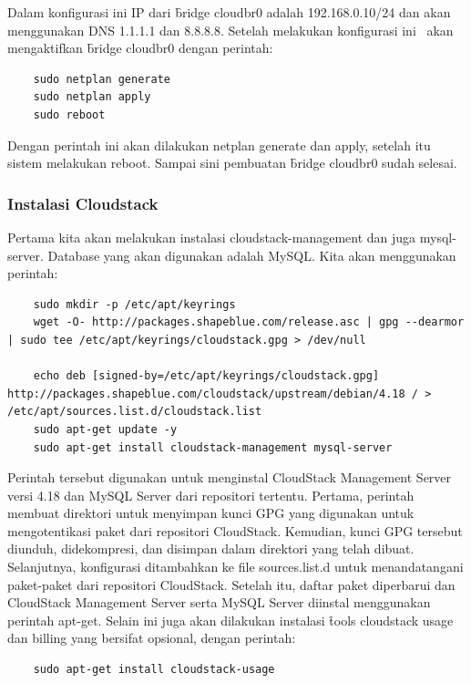 Dalam konfigurasi ini IP dari \f{bridge} cloudbr0 adalah 192.168.0.10/24 dan akan menggunakan DNS 1.1.1.1 dan 8.8.8.8. Setelah melakukan konfigurasi ini \saya\ akan mengaktifkan \f{bridge} cloudbr0 dengan perintah:

\begin{verbatim}
    sudo netplan generate
    sudo netplan apply
    sudo reboot
\end{verbatim}

Dengan perintah ini akan dilakukan netplan generate dan apply, setelah itu sistem melakukan reboot. Sampai sini pembuatan \f{bridge} cloudbr0 sudah selesai.

\subsubsection{Instalasi Cloudstack}
Pertama kita akan melakukan instalasi cloudstack-management dan juga mysql-server. Database yang akan digunakan adalah MySQL. Kita akan menggunakan perintah:

\begin{listing}[H]
    \begin{verbatim}
    sudo mkdir -p /etc/apt/keyrings
    wget -O- http://packages.shapeblue.com/release.asc | gpg --dearmor | sudo tee /etc/apt/keyrings/cloudstack.gpg > /dev/null

    echo deb [signed-by=/etc/apt/keyrings/cloudstack.gpg] http://packages.shapeblue.com/cloudstack/upstream/debian/4.18 / > /etc/apt/sources.list.d/cloudstack.list
    sudo apt-get update -y
    sudo apt-get install cloudstack-management mysql-server
    \end{verbatim}
\end{listing}

Perintah tersebut digunakan untuk menginstal CloudStack Management Server versi 4.18 dan MySQL Server dari repositori tertentu. Pertama, perintah membuat direktori untuk menyimpan kunci GPG yang digunakan untuk mengotentikasi paket dari repositori CloudStack. Kemudian, kunci GPG tersebut diunduh, didekompresi, dan disimpan dalam direktori yang telah dibuat. Selanjutnya, konfigurasi ditambahkan ke file sources.list.d untuk menandatangani paket-paket dari repositori CloudStack. Setelah itu, daftar paket diperbarui dan CloudStack Management Server serta MySQL Server diinstal menggunakan perintah apt-get. Selain ini juga akan dilakukan instalasi \f{tools} cloudstack usage dan billing yang bersifat opsional, dengan perintah:

\begin{verbatim}
    sudo apt-get install cloudstack-usage
\end{verbatim}

